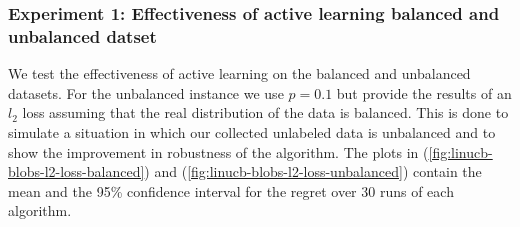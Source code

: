 \documentclass{article}
\begin{document}
\subsubsection{Experiment 1: Effectiveness of active learning balanced and unbalanced datset}
We test the effectiveness of active learning on the balanced and unbalanced datasets.
For the unbalanced instance we use $p = 0.1$ but provide the results of an $l_2$ loss assuming that the real distribution of the data is balanced.
This is done to simulate a situation in which our collected unlabeled data is unbalanced and to show the improvement in robustness of the
algorithm. The plots in (\ref{fig:linucb-blobs-l2-loss-balanced}) and (\ref{fig:linucb-blobs-l2-loss-unbalanced})  contain the mean and the 95\% confidence interval for the
regret over 30 runs of each algorithm.
\end{document}
